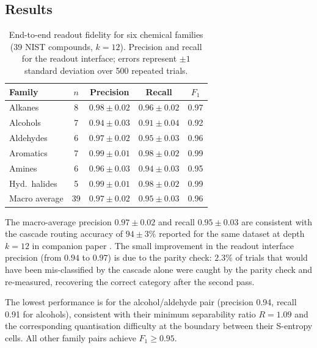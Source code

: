 \documentclass[11pt,twocolumn,a4paper]{article}
\theoremstyle{definition}
\theoremstyle{remark}
\begin{document}
\subsection{Results}

\begin{table}[h]
\centering
\small
\caption{End-to-end readout fidelity for six chemical families (39 NIST compounds,
$k = 12$). Precision and recall for the readout interface; errors represent
$\pm 1$ standard deviation over 500 repeated trials.}
\label{tab:validation}
\setlength{\tabcolsep}{4pt}
\begin{tabular}{lcccc}
\toprule
Family & $n$ & Precision & Recall & $F_1$ \\
\midrule
Alkanes       & 8  & $0.98 \pm 0.02$ & $0.96 \pm 0.02$ & 0.97 \\
Alcohols      & 7  & $0.94 \pm 0.03$ & $0.91 \pm 0.04$ & 0.92 \\
Aldehydes     & 6  & $0.97 \pm 0.02$ & $0.95 \pm 0.03$ & 0.96 \\
Aromatics     & 7  & $0.99 \pm 0.01$ & $0.98 \pm 0.02$ & 0.99 \\
Amines        & 6  & $0.96 \pm 0.03$ & $0.94 \pm 0.03$ & 0.95 \\
Hyd.\ halides & 5  & $0.99 \pm 0.01$ & $0.98 \pm 0.02$ & 0.99 \\
\midrule
Macro average & 39 & $0.97 \pm 0.02$ & $0.95 \pm 0.03$ & 0.96 \\
\bottomrule
\end{tabular}
\end{table}

The macro-average precision $0.97 \pm 0.02$ and recall $0.95 \pm 0.03$ are
consistent with the cascade routing accuracy of $94 \pm 3\%$ reported for the
same dataset at depth $k = 12$ in companion paper \citep{companion5}. The small
improvement in the readout interface precision (from $0.94$ to $0.97$) is due
to the parity check: $2.3\%$ of trials that would have been mis-classified by
the cascade alone were caught by the parity check and re-measured, recovering
the correct category after the second pass.

The lowest performance is for the alcohol/aldehyde pair (precision 0.94, recall
0.91 for alcohols), consistent with their minimum separability ratio $R = 1.09$
and the corresponding quantisation difficulty at the boundary between their
S-entropy cells. All other family pairs achieve $F_1 \geq 0.95$.
\end{document}
